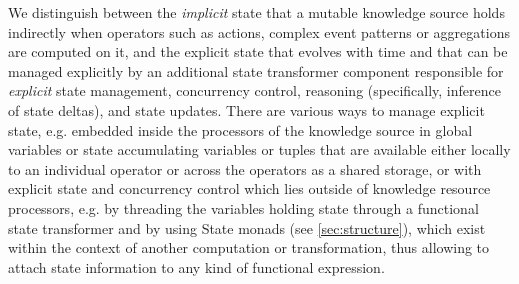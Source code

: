 \documentclass[runningheads]{llncs}
\begin{document}
We distinguish between the \textit{implicit} state that a mutable knowledge source holds indirectly when operators such as actions, complex  event patterns or aggregations are computed on it, and the explicit state that evolves with time and that can be managed explicitly by an additional state transformer component responsible for \textit{explicit} state management, concurrency control, reasoning (specifically, inference of state deltas), and state updates. 
There are various ways to manage explicit state, e.g. embedded inside the processors of the knowledge source in global variables or state accumulating variables or tuples that are available either locally to an individual operator or across the operators as a shared storage, or with explicit state and concurrency control which lies outside of knowledge resource processors, e.g. by threading the variables holding state through a functional state transformer and by using State monads (see \ref{sec:structure}), which exist within the context of another computation or transformation, thus allowing to attach state information to any kind of functional expression.


\end{document}
